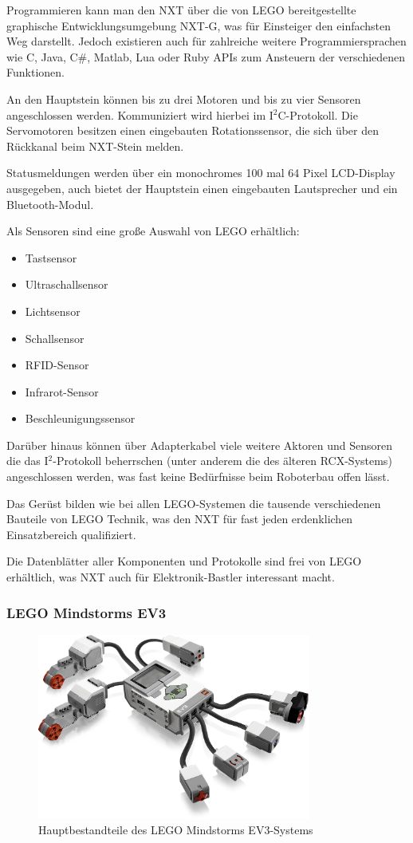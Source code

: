 Programmieren kann man den NXT über die von LEGO bereitgestellte graphische Entwicklungsumgebung NXT-G, was für Einsteiger den einfachsten Weg darstellt. Jedoch existieren auch für zahlreiche weitere Programmiersprachen wie C, Java, C\#, Matlab, Lua oder Ruby APIs zum Ansteuern der verschiedenen Funktionen.

An den Hauptstein können bis zu drei Motoren und bis zu vier Sensoren angeschlossen werden. Kommuniziert wird hierbei im I$^2$C-Protokoll. Die Servomotoren besitzen einen eingebauten Rotationssensor, die sich über den Rückkanal beim NXT-Stein melden.

Statusmeldungen werden über ein monochromes 100 mal 64 Pixel LCD-Display ausgegeben, auch bietet der Hauptstein einen eingebauten Lautsprecher und ein Bluetooth-Modul.

Als Sensoren sind eine große Auswahl von LEGO erhältlich:
\begin{itemize}
\item Tastsensor
\item Ultraschallsensor
\item Lichtsensor
\item Schallsensor
\item RFID-Sensor
\item Infrarot-Sensor
\item Beschleunigungssensor
\end{itemize}

Darüber hinaus können über Adapterkabel viele weitere Aktoren und Sensoren die das I$^2$-Protokoll beherrschen (unter anderem die des älteren RCX-Systems) angeschlossen werden, was fast keine Bedürfnisse beim Roboterbau offen lässt.

Das Gerüst bilden wie bei allen LEGO-Systemen die tausende verschiedenen Bauteile von LEGO Technik, was den NXT für fast jeden erdenklichen Einsatzbereich qualifiziert.

Die Datenblätter aller Komponenten und Protokolle sind frei von LEGO erhältlich, was NXT auch für Elektronik-Bastler interessant macht.

\subsubsection{LEGO Mindstorms EV3}

\begin{figure}[h]
\centering
\includegraphics[width=0.8\textwidth]{Bilder/MatsAndMets/ev3}
\caption{Hauptbestandteile des LEGO Mindstorms EV3-Systems}
\label{fig:ev3}
\end{figure}

